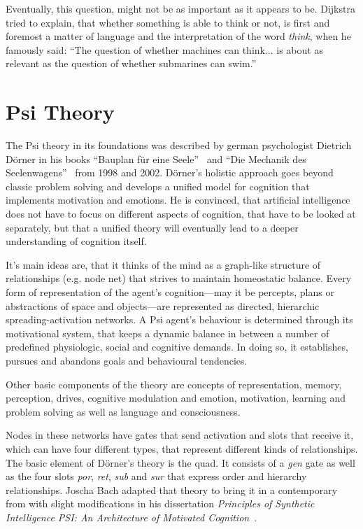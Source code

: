 Eventually, this question, might not be as important as it appears to be. Dijkstra tried to explain, that whether something is able to think or not, is first and foremost a matter of language and the interpretation of the word \emph{think}, when he famously said: ``The question of whether machines can think... is about as relevant as the question of whether submarines can swim.''

    \section{Psi Theory}
The Psi theory in its foundations was described by german psychologist Dietrich Dörner in his books ``Bauplan für eine Seele''~\cite{Doerner1998} and ``Die Mechanik des Seelenwagens''~\cite{dorner2002mechanik} from 1998 and 2002. Dörner's holistic approach goes beyond classic problem solving and develops a unified model for cognition that implements motivation and emotions. He is convinced, that artificial intelligence does not have to focus on different aspects of cognition, that have to be looked at separately, but that a unified theory will eventually lead to a deeper understanding of cognition itself.

It's main ideas are, that it thinks of the mind as a graph-like structure of relationships (e.g. node net) that strives to maintain homeostatic balance. Every form of representation of the agent's cognition---may it be percepts, plans or abstractions of space and objects---are represented as directed, hierarchic spreading-activation networks. A Psi agent's behaviour is determined through its motivational system, that keeps a dynamic balance in between a number of predefined physiologic, social and cognitive demands. In doing so, it establishes, pursues and abandons goals and behavioural tendencies.~\cite{Bach:2009:PSI:1611304}

Other basic components of the theory are concepts of representation, memory, perception, drives, cognitive modulation and emotion, motivation, learning and problem solving as well as language and consciousness.

Nodes in these networks have gates that send activation and slots that receive it, which can have four different types, that represent different kinds of relationships. The basic element of Dörner's theory is the quad. It consists of a \emph{gen} gate as well as the four slots \emph{por}, \emph{ret}, \emph{sub} and \emph{sur} that express order and hierarchy relationships. Joscha Bach adapted that theory to bring it in a contemporary from with slight modifications in his dissertation \emph{Principles of Synthetic Intelligence PSI: An Architecture of Motivated Cognition}~\cite{Bach:2009:PSI:1611304}.

